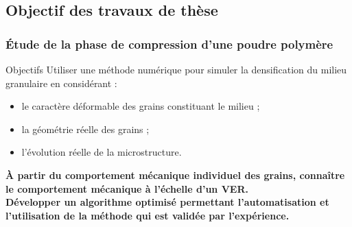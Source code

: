 \documentclass[8pt]{beamer}
\begin{document}
\subsection{Objectif des travaux de thèse}
\begin{frame}
	\frametitle{\'Etude de la phase de compression d'une poudre polymère}
	\vfill
	\begin{block}{Objectifs}
		Utiliser une méthode numérique pour simuler la densification du milieu granulaire en considérant :
		\begin{itemize}[label=$\rightarrow$]
			\item le caractère déformable des grains constituant le milieu ;
			\item la géométrie réelle des grains ;
			\item l'évolution réelle de la microstructure.
		\end{itemize}
	\end{block}\vfill\centering
	\textbf{\`A partir du comportement mécanique individuel des grains, connaître le comportement mécanique à l'échelle d'un VER.}\\\vfill
	\textbf{Développer un algorithme optimisé permettant l'automatisation et l'utilisation de la méthode qui est validée par l'expérience.}\\
	\vfill
\end{frame}
\end{document}
